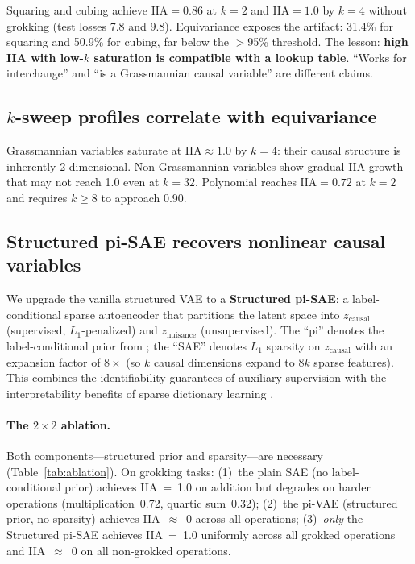 \documentclass{article}
\newcommand{\IIA}{\mathrm{IIA}}
\begin{document}
Squaring and cubing achieve $\IIA = 0.86$ at $k = 2$ and $\IIA = 1.0$ by $k = 4$
without grokking (test losses 7.8 and 9.8). Equivariance exposes the artifact:
31.4\% for squaring and 50.9\% for cubing, far below the $>$95\% threshold. The
lesson: \textbf{high IIA with low-$k$ saturation is compatible with a lookup
table}. ``Works for interchange'' and ``is a Grassmannian causal variable'' are
different claims.

\subsection{$k$-sweep profiles correlate with equivariance}

Grassmannian variables saturate at $\IIA \approx 1.0$ by $k = 4$: their causal
structure is inherently 2-dimensional. Non-Grassmannian variables show gradual IIA
growth that may not reach 1.0 even at $k = 32$. Polynomial reaches
$\IIA = 0.72$ at $k = 2$ and requires $k \geq 8$ to approach 0.90.

\subsection{Structured pi-SAE recovers nonlinear causal variables}
\label{sec:vae_results}

We upgrade the vanilla structured VAE to a \textbf{Structured pi-SAE}: a
label-conditional sparse autoencoder that partitions the latent space into
$z_\text{causal}$ (supervised, $L_1$-penalized) and $z_\text{nuisance}$
(unsupervised). The ``pi'' denotes the label-conditional prior from
\citet{narayanaswamy2017learning}; the ``SAE'' denotes $L_1$ sparsity on
$z_\text{causal}$ with an expansion factor of $8\times$ (so $k$ causal
dimensions expand to $8k$ sparse features). This combines the identifiability
guarantees of auxiliary supervision \citep{khemakhem2020variational} with the
interpretability benefits of sparse dictionary learning
\citep{bricken2023towards}.

\paragraph{The $2 \times 2$ ablation.}
Both components---structured prior and sparsity---are necessary
(Table~\ref{tab:ablation}). On grokking tasks: (1)~the plain SAE (no
label-conditional prior) achieves IIA~=~1.0 on addition but degrades on harder
operations (multiplication~0.72, quartic sum~0.32); (2)~the pi-VAE (structured
prior, no sparsity) achieves IIA~$\approx$~0 across all operations;
(3)~\emph{only} the Structured pi-SAE achieves IIA~=~1.0 uniformly across all
grokked operations and IIA~$\approx$~0 on all non-grokked operations.
\end{document}
